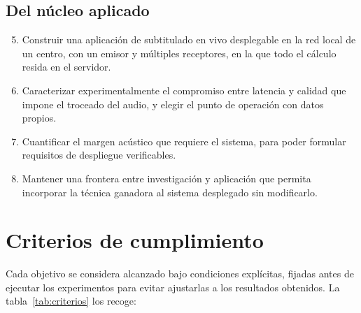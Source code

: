 \subsection*{Del núcleo aplicado}

\begin{enumerate}\setcounter{enumi}{4}
  \item Construir una aplicación de subtitulado en vivo desplegable en la red local de un
        centro, con un emisor y múltiples receptores, en la que todo el cálculo resida en
        el servidor.
  \item Caracterizar experimentalmente el compromiso entre latencia y calidad que impone el
        troceado del audio, y elegir el punto de operación con datos propios.
  \item Cuantificar el margen acústico que requiere el sistema, para poder formular
        requisitos de despliegue verificables.
  \item Mantener una frontera entre investigación y aplicación que permita incorporar la
        técnica ganadora al sistema desplegado sin modificarlo.
\end{enumerate}

\section{Criterios de cumplimiento}

Cada objetivo se considera alcanzado bajo condiciones explícitas, fijadas antes de
ejecutar los experimentos para evitar ajustarlas a los resultados obtenidos. La
tabla~\ref{tab:criterios} los recoge:

